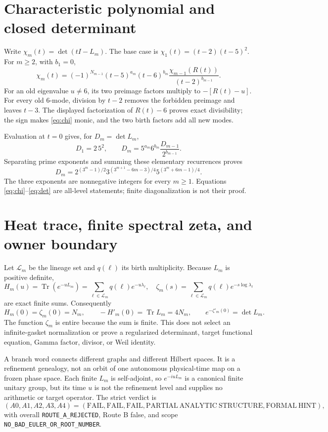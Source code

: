 \documentclass[9pt]{extarticle}
\newcommand{\Tr}{\operatorname{Tr}}
\begin{document}
\section{Characteristic polynomial and closed determinant}
Write $\chi_m(t)=\det(tI-L_m)$.  The base case is
$\chi_1(t)=(t-2)(t-5)^2$.  For $m\ge2$, with $b_1=0$,
\begin{equation}\label{eq:chi}
 \boxed{\chi_m(t)=(-1)^{N_{m-1}}(t-5)^{a_m}(t-6)^{b_m}
 \frac{\chi_{m-1}(R(t))}{(t-2)^{b_{m-1}}}.}
\end{equation}
For an old eigenvalue $u\ne6$, its two preimage factors multiply to
$-[R(t)-u]$.  For every old 6-mode, division by $t-2$ removes the forbidden
preimage and leaves $t-3$.  The displayed factorization of $R(t)-6$ proves
exact divisibility; the sign makes \eqref{eq:chi} monic, and the two birth
factors add all new modes.

Evaluation at $t=0$ gives, for $D_m=\det L_m$,
\[
 D_1=2\,5^2,\qquad
 D_m=5^{a_m}6^{b_m}\frac{D_{m-1}}{2^{b_{m-1}}}.
\]
Separating prime exponents and summing these elementary recurrences proves
\begin{equation}\label{eq:det}
 \boxed{D_m=2^{(3^m-1)/2}
 3^{(3^{m+1}-6m-3)/4}5^{(3^m+6m-1)/4}.}
\end{equation}
The three exponents are nonnegative integers for every $m\ge1$.  Equations
\eqref{eq:chi}--\eqref{eq:det} are all-level statements; finite
diagonalization is not their proof.

\section{Heat trace, finite spectral zeta, and owner boundary}
Let $\mathcal L_m$ be the lineage set and $q(\ell)$ its birth multiplicity.
Because $L_m$ is positive definite,
\[
 H_m(u)=\Tr(e^{-uL_m})=
 \sum_{\ell\in\mathcal L_m}q(\ell)e^{-u\lambda_\ell},
\quad
 \zeta_m(s)=\sum_{\ell\in\mathcal L_m}q(\ell)
 e^{-s\log\lambda_\ell}
\]
are exact finite sums.  Consequently
\[
 H_m(0)=\zeta_m(0)=N_m,\qquad -H'_m(0)=\Tr L_m=4N_m,
\qquad e^{-\zeta'_m(0)}=\det L_m.
\]
The function $\zeta_m$ is entire because the sum is finite.  This does not
select an infinite-gasket normalization or prove a regularized determinant,
target functional equation, Gamma factor, divisor, or Weil identity.

A branch word connects different graphs and different Hilbert spaces.  It
is a refinement genealogy, not an orbit of one autonomous physical-time map
on a frozen phase space.  Each finite $L_m$ is self-adjoint, so
$e^{-iuL_m}$ is a canonical finite unitary group, but its time $u$ is not
the refinement level and supplies no arithmetic or target operator.  The
strict verdict is
\[
 (A0,A1,A2,A3,A4)=(\mathrm{FAIL},\mathrm{FAIL},\mathrm{FAIL},
 \mathrm{PARTIAL\ ANALYTIC\ STRUCTURE},\mathrm{FORMAL\ HINT}),
\]
with overall \texttt{ROUTE\_A\_REJECTED}, Route B false, and scope
\texttt{NO\_BAD\_EULER\_OR\_ROOT\_NUMBER}.
\end{document}
